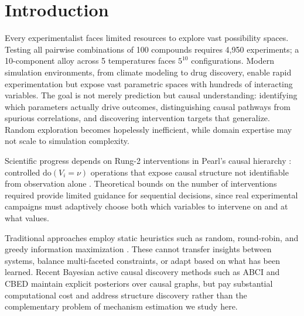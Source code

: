 \documentclass{article}
\theoremstyle{plain}
\theoremstyle{definition}
\theoremstyle{remark}
\begin{document}
\begin{abstract}
$43$--$50\%$ at 30 nodes under both lookahead accountings, with the zero-hidden-query variant winning while consuming $3.7$--$5.2\times$ fewer queries than the baselines it beats. Finally, we recast the non-stationarity argument for preference-based learning as a local, slow-drift invariance rather than a global monotonic-decay assumption, which better matches the empirical adjacent-episode rank stability (Spearman $\rho > 0.85$) we observe throughout training, and we give the full, previously code-only definitions of the diversity and node-importance reward terms in the main text.
\end{abstract}

\section{Introduction}

Every experimentalist faces limited resources to explore vast possibility spaces. Testing all pairwise combinations of 100 compounds requires 4{,}950 experiments; a 10-component alloy across 5 temperatures faces $5^{10}$ configurations. Modern simulation environments, from climate modeling to drug discovery, enable rapid experimentation but expose vast parametric spaces with hundreds of interacting variables. The goal is not merely prediction but causal understanding: identifying which parameters actually drive outcomes, distinguishing causal pathways from spurious correlations, and discovering intervention targets that generalize. Random exploration becomes hopelessly inefficient, while domain expertise may not scale to simulation complexity.

Scientific progress depends on Rung-2 interventions in Pearl's causal hierarchy \citep{pearl2009causality,pearl2018book}: controlled $\text{do}(V_i = \nu)$ operations that expose causal structure not identifiable from observation alone \citep{spirtes2000causation,peters2017elements,reichenbach1956}. Theoretical bounds on the number of interventions required \citep{eberhardt2005number,hauser2012characterization} provide limited guidance for sequential decisions, since real experimental campaigns must adaptively choose both which variables to intervene on and at what values.

Traditional approaches employ static heuristics such as random, round-robin, and greedy information maximization \citep{murphy2001active,hauser2012characterization}. These cannot transfer insights between systems, balance multi-faceted constraints, or adapt based on what has been learned. Recent Bayesian active causal discovery methods such as ABCI \citep{toth2022active} and CBED \citep{tigas2022interventions} maintain explicit posteriors over causal graphs, but pay substantial computational cost and address structure discovery rather than the complementary problem of mechanism estimation we study here.
\end{document}
